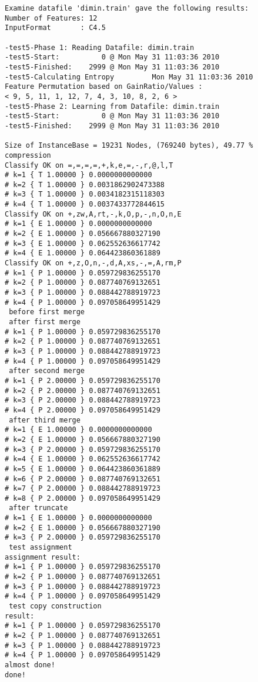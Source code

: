 \documentclass{report}
\begin{document}
\begin{footnotesize}
\begin{verbatim}
Examine datafile 'dimin.train' gave the following results:
Number of Features: 12
InputFormat       : C4.5

-test5-Phase 1: Reading Datafile: dimin.train
-test5-Start:          0 @ Mon May 31 11:03:36 2010
-test5-Finished:    2999 @ Mon May 31 11:03:36 2010
-test5-Calculating Entropy         Mon May 31 11:03:36 2010
Feature Permutation based on GainRatio/Values :
< 9, 5, 11, 1, 12, 7, 4, 3, 10, 8, 2, 6 >
-test5-Phase 2: Learning from Datafile: dimin.train
-test5-Start:          0 @ Mon May 31 11:03:36 2010
-test5-Finished:    2999 @ Mon May 31 11:03:36 2010

Size of InstanceBase = 19231 Nodes, (769240 bytes), 49.77 % compression
Classify OK on =,=,=,=,+,k,e,=,-,r,@,l,T
# k=1 { T 1.00000 } 0.0000000000000
# k=2 { T 1.00000 } 0.0031862902473388
# k=3 { T 1.00000 } 0.0034182315118303
# k=4 { T 1.00000 } 0.0037433772844615
Classify OK on +,zw,A,rt,-,k,O,p,-,n,O,n,E
# k=1 { E 1.00000 } 0.0000000000000
# k=2 { E 1.00000 } 0.056667880327190
# k=3 { E 1.00000 } 0.062552636617742
# k=4 { E 1.00000 } 0.064423860361889
Classify OK on +,z,O,n,-,d,A,xs,-,=,A,rm,P
# k=1 { P 1.00000 } 0.059729836255170
# k=2 { P 1.00000 } 0.087740769132651
# k=3 { P 1.00000 } 0.088442788919723
# k=4 { P 1.00000 } 0.097058649951429
 before first merge 
 after first merge 
# k=1 { P 1.00000 } 0.059729836255170
# k=2 { P 1.00000 } 0.087740769132651
# k=3 { P 1.00000 } 0.088442788919723
# k=4 { P 1.00000 } 0.097058649951429
 after second merge 
# k=1 { P 2.00000 } 0.059729836255170
# k=2 { P 2.00000 } 0.087740769132651
# k=3 { P 2.00000 } 0.088442788919723
# k=4 { P 2.00000 } 0.097058649951429
 after third merge 
# k=1 { E 1.00000 } 0.0000000000000
# k=2 { E 1.00000 } 0.056667880327190
# k=3 { P 2.00000 } 0.059729836255170
# k=4 { E 1.00000 } 0.062552636617742
# k=5 { E 1.00000 } 0.064423860361889
# k=6 { P 2.00000 } 0.087740769132651
# k=7 { P 2.00000 } 0.088442788919723
# k=8 { P 2.00000 } 0.097058649951429
 after truncate 
# k=1 { E 1.00000 } 0.0000000000000
# k=2 { E 1.00000 } 0.056667880327190
# k=3 { P 2.00000 } 0.059729836255170
 test assignment
assignment result: 
# k=1 { P 1.00000 } 0.059729836255170
# k=2 { P 1.00000 } 0.087740769132651
# k=3 { P 1.00000 } 0.088442788919723
# k=4 { P 1.00000 } 0.097058649951429
 test copy construction
result: 
# k=1 { P 1.00000 } 0.059729836255170
# k=2 { P 1.00000 } 0.087740769132651
# k=3 { P 1.00000 } 0.088442788919723
# k=4 { P 1.00000 } 0.097058649951429
almost done!
done!
\end{verbatim}
\end{footnotesize}
\clearpage
\end{document}
